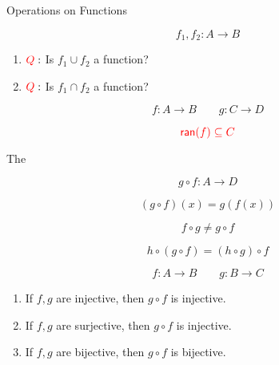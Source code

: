 \begin{frame}{}
  \begin{center}
    {\LARGE Operations on Functions}
  \end{center}
\end{frame}

\begin{frame}{}
  \begin{definition}
    \[
      f_1, f_2: A \to B
    \]

    \begin{enumerate}[(1)]
	\centering
      \item $\textcolor{red}{Q}:$ Is $f_1 \cup f_2$ a function?
      \item $\textcolor{red}{Q}:$ Is $f_1 \cap f_2$ a function?
    \end{enumerate}
  \end{definition}
\end{frame}

\begin{frame}{}
  \begin{definition}[Composition]
    \[
      f: A \to B \qquad g: C \to D
    \]

    \[
      \textcolor{red}{\textsf{ran}(f) \subseteq C}
    \]

    The 

    \[
      g \circ f : A \to D
    \]

    \[
      (g \circ f) (x) = g(f(x))
    \]
  \end{definition}
\end{frame}

\begin{frame}{}
  \begin{theorem}
    \[
      f \circ g \neq g \circ f
    \]

    \[
      h \circ (g \circ f) = (h \circ g) \circ f
    \]
  \end{theorem}
\end{frame}

\begin{frame}{}
  \begin{theorem}
    \[
      f: A \to B \qquad g: B \to C
    \]

    \begin{enumerate}[(1)]
      \item If $f, g$ are injective, then $g \circ f$ is injective.
      \item If $f, g$ are surjective, then $g \circ f$ is injective.
      \item If $f, g$ are bijective, then $g \circ f$ is bijective.
    \end{enumerate}
  \end{theorem}
\end{frame}

\begin{frame}{}
\end{frame}

\begin{frame}{}
\end{frame}

\begin{frame}{}
\end{frame}
